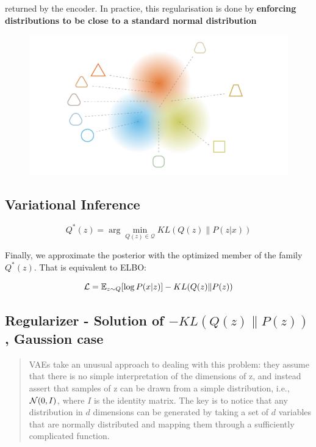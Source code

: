 returned by the encoder. In practice, this regularisation is done by \textbf{enforcing
distributions to be close to a standard normal distribution}
\begin{figure}[H]
    \centering
    \includegraphics[width=12cm]{images/vae_regularisation.png}
    \label{fig:regularised_distributions_vae}
\end{figure}

\subsection{Variational Inference}
\begin{equation}
    Q^*(z) = \arg \min_{Q(z) \in \mathcal{Q}} KL(Q(z)\|P(z|x))
\end{equation}

Finally, we approximate the posterior with the optimized member of the family $Q^*(z)$. That is equivalent to ELBO:

\begin{equation}
    \mathcal{L} = \mathbb{E}_{z \sim Q} [\log P(x|z)] - KL(Q(z)\|P(z))
\end{equation}

\subsection{Regularizer - Solution of $- KL(Q(z)\|P(z))$, Gaussion case}
\begin{quotation}
    VAEs take an unusual approach to dealing with this problem: they assume that there is no simple interpretation
    of the dimensions of z, and instead assert that samples of z can be drawn from a simple distribution, i.e.,
    $\mathcal{N}(0, I)$, where $I$ is the identity matrix. The key is to notice that any distribution in $d$ dimensions
    can be generated by taking a set of $d$ variables that are normally distributed and mapping them through a sufficiently
    complicated function.
\end{quotation}

